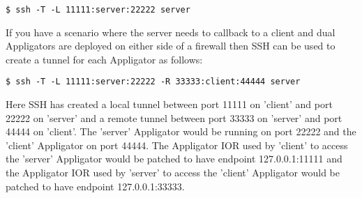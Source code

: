 \verb+$ ssh -T -L 11111:server:22222 server+

If you have a scenario where the server needs to callback to a client
and dual Appligators are deployed on either side of a firewall then
SSH can be used to create a tunnel for each Appligator as follows:

\verb+$ ssh -T -L 11111:server:22222 -R 33333:client:44444 server+

Here SSH has created a local tunnel between port 11111 on 'client' and
port 22222 on 'server' and a remote tunnel between port 33333 on
'server' and port 44444 on 'client'. The 'server' Appligator would be
running on port 22222 and the 'client' Appligator on port 44444. The
Appligator IOR used by 'client' to access the 'server' Appligator
would be patched to have endpoint 127.0.0.1:11111 and the Appligator
IOR used by 'server' to access the 'client' Appligator would be
patched to have endpoint 127.0.0.1:33333.



